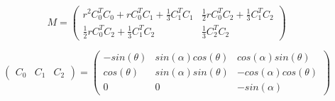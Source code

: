 \begin{equation}  
M = 
    \left(
    \begin{matrix}
        r^2C_0^T C_0 + rC_0^T C_1 + \frac{1}{3} C_1^T C_1 &
        \frac{1}{2} r C_0^T C_2 + \frac{1}{3} C_1^TC_2 \\
        \frac{1}{2} r C_0^T C_2 + \frac{1}{3} C_1^TC_2   &
        \frac{1}{3} C_2^T C_2
    \end{matrix}
    \right)
\end{equation}

\begin{equation}
    \left( \begin{matrix}
        C_0 & C_1 & C_2
    \end{matrix} \right)
   =
        \left(  \begin{matrix} 
        -sin(\theta) &   sin(\alpha) cos(\theta) & cos(\alpha) sin(\theta) \\
        cos(\theta) & sin(\alpha) sin(\theta) &  - cos(\alpha) cos(\theta) \\
        0 &  0 &- sin(\alpha)
    \end{matrix}\right) 
\end{equation}
